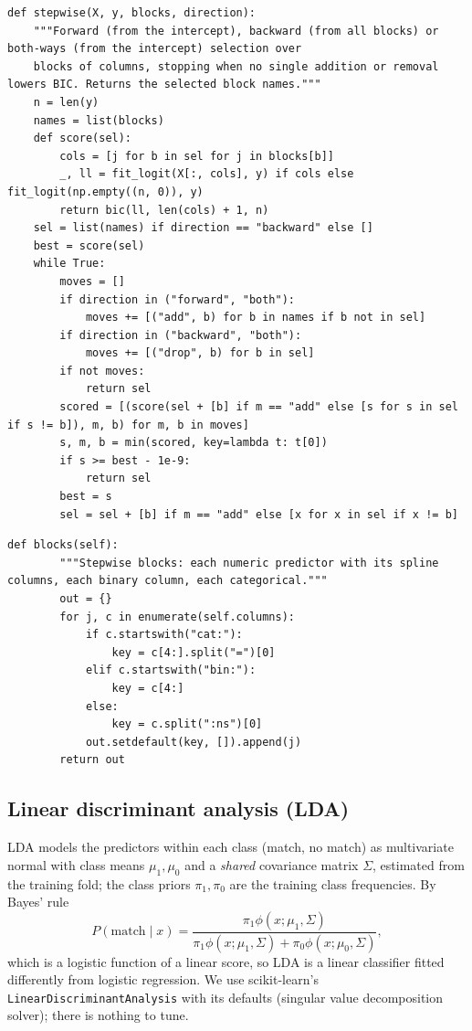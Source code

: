 \documentclass[11pt]{article}
\begin{document}
\begin{lstlisting}[caption={Stepwise selection over blocks (scripts/modeling.py)}]
def stepwise(X, y, blocks, direction):
    """Forward (from the intercept), backward (from all blocks) or both-ways (from the intercept) selection over
    blocks of columns, stopping when no single addition or removal lowers BIC. Returns the selected block names."""
    n = len(y)
    names = list(blocks)
    def score(sel):
        cols = [j for b in sel for j in blocks[b]]
        _, ll = fit_logit(X[:, cols], y) if cols else fit_logit(np.empty((n, 0)), y)
        return bic(ll, len(cols) + 1, n)
    sel = list(names) if direction == "backward" else []
    best = score(sel)
    while True:
        moves = []
        if direction in ("forward", "both"):
            moves += [("add", b) for b in names if b not in sel]
        if direction in ("backward", "both"):
            moves += [("drop", b) for b in sel]
        if not moves:
            return sel
        scored = [(score(sel + [b] if m == "add" else [s for s in sel if s != b]), m, b) for m, b in moves]
        s, m, b = min(scored, key=lambda t: t[0])
        if s >= best - 1e-9:
            return sel
        best = s
        sel = sel + [b] if m == "add" else [x for x in sel if x != b]
\end{lstlisting}

\begin{lstlisting}[caption={The blocks stepwise selects (scripts/modeling.py)}]
    def blocks(self):
        """Stepwise blocks: each numeric predictor with its spline columns, each binary column, each categorical."""
        out = {}
        for j, c in enumerate(self.columns):
            if c.startswith("cat:"):
                key = c[4:].split("=")[0]
            elif c.startswith("bin:"):
                key = c[4:]
            else:
                key = c.split(":ns")[0]
            out.setdefault(key, []).append(j)
        return out
\end{lstlisting}

\subsection{Linear discriminant analysis (LDA)}

LDA models the predictors within each class (match, no match) as multivariate normal with class means
$\mu_1, \mu_0$ and a \emph{shared} covariance matrix $\Sigma$, estimated from the training fold; the class priors
$\pi_1, \pi_0$ are the training class frequencies. By Bayes' rule
\[
P(\text{match}\mid x) = \frac{\pi_1 \phi(x;\mu_1,\Sigma)}{\pi_1 \phi(x;\mu_1,\Sigma) + \pi_0 \phi(x;\mu_0,\Sigma)},
\]
which is a logistic function of a linear score, so LDA is a linear classifier fitted differently from logistic
regression. We use scikit-learn's \texttt{LinearDiscriminantAnalysis} with its defaults (singular value
decomposition solver); there is nothing to tune.
\end{document}
